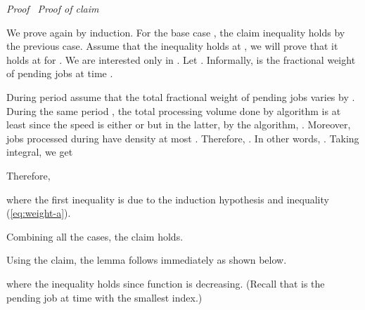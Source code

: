 \documentclass[11pt]{article}
\newenvironment{proof}{\noindent\emph{Proof\ }}{\hspace*{\fill}\medskip}
\newenvironment{claimproof}{\noindent\emph{Proof of claim\ }}{\hspace*{\fill}\medskip}
\begin{document}
\begin{proof}
\begin{claimproof}
\begin{description}
		We prove again by induction. For the base case , the claim inequality holds
		by the previous case. Assume that the inequality holds at , we will prove that 
		it holds at  for . We are interested only in .
		Let . Informally,  is the fractional
		weight of pending jobs at time . 
		
		During period  assume that the total fractional weight of pending jobs 
		varies by . During the same period ,
		the total processing volume done by algorithm is at least
		 since the speed is either  or 
		 but in the latter, by the algorithm, .
		Moreover, jobs  processed during  have density at most .
		Therefore, . In other words,
		. Taking integral, we get   
		
		Therefore, 
		
		where the first inequality is due to the induction hypothesis and inequality (\ref{eq:weight-a}).	



\end{description}
Combining all the cases, the claim holds.
\end{claimproof}

Using the claim, the lemma follows immediately as shown below.

where the inequality holds since function  is decreasing. (Recall that  is the pending job 
at time  with the smallest index.)
\end{proof}
\end{document}
